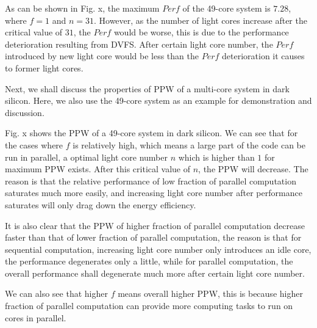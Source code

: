 As can be shown in Fig. x, the maximum $Perf$ of the 49-core system is $7.28$, where $f = 1$ and $n = 31$. However, as the number of light cores increase after the critical value of $31$, the $Perf$ would be worse, this is due to the performance deterioration resulting from DVFS. After certain light core number, the $Perf$ introduced by new light core would be less than the $Perf$ deterioration it causes to former light cores. 

Next, we shall discuss the properties of PPW of a multi-core system in dark silicon. Here, we also use the 49-core system as an example for demonstration and discussion.

Fig. x shows the PPW of a 49-core system in dark silicon. We can see that for the cases where $f$ is relatively high, which means a large part of the code can be run in parallel, a optimal light core number $n$ which is higher than $1$ for maximum PPW exists. After this critical value of $n$, the PPW will decrease. The reason is that the relative performance of low fraction of parallel computation saturates much more easily, and increasing light core number after performance saturates will only drag down the energy efficiency.  

It is also clear that the PPW of higher fraction of parallel computation decrease faster than that of lower fraction of parallel computation, the reason is that for sequential computation, increasing light core number only introduces an idle core, the performance degenerates only a little, while for parallel computation, the overall performance shall degenerate much more after certain light core number.

We can also see that higher $f$ means overall higher PPW, this is because higher fraction of parallel computation can provide more computing tasks to run on cores in parallel.
